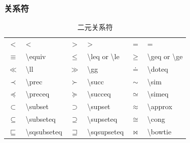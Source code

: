 \documentclass[a4paper]{ctexart}
\begin{document}
    \subsubsection{关系符}
    \begin{table}[H]
        \centering
        \caption{二元关系符}
        \begin{tabular}{clclcl}
            \toprule
            $<$             & <                         & $>$           & >                                         & 
            $=$             & =                                                                                     \\
            $\equiv$        & \textbackslash equiv      & $\leq$        & \textbackslash leq or \textbackslash le   & 
            $\geq$          & \textbackslash geq or \textbackslash ge                                               \\
            $\ll$           & \textbackslash ll         & $\gg$         & \textbackslash gg                         & 
            $\doteq$        & \textbackslash doteq                                                                  \\
            $\prec$         & \textbackslash prec       & $\succ$       & \textbackslash succ                       &
            $\sim$          & \textbackslash sim                                                                    \\
            $\preceq$       & \textbackslash preceq     & $\succeq$     & \textbackslash succeq                     &
            $\simeq$        & \textbackslash simeq                                                                  \\
            $\subset$       & \textbackslash subset     & $\supset$     & \textbackslash supset                     &
            $\approx$       & \textbackslash approx                                                                 \\
            $\subseteq$     & \textbackslash subseteq   & $\supseteq$   & \textbackslash supseteq                   &
            $\cong$         & \textbackslash cong                                                                   \\
            $\sqsubseteq$   & \textbackslash sqsubseteq & $\sqsupseteq$ & \textbackslash sqsupseteq                 & 
            $\bowtie$       & \textbackslash bowtie                                                                 \\

\end{tabular}
\end{table}
\end{document}
